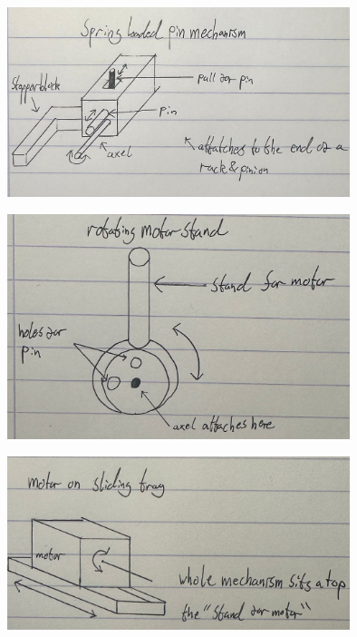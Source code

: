 \documentclass{article}
\begin{document}
 \begin{figure}[!b]
    \centering
    \includegraphics[width=10cm]{figs/design1.jpg}
    \caption{}
    \label{fig:1}
\end{figure}
 \begin{figure}[!b]
    \centering
    \includegraphics[width=10cm]{figs/design2.jpg}
    \caption{}
    \label{fig:1}
\end{figure}
 \begin{figure}[!b]
    \centering
    \includegraphics[width=10cm]{figs/design3.jpg}
    \caption{}
    \label{fig:1}
\end{figure}
\end{document}
